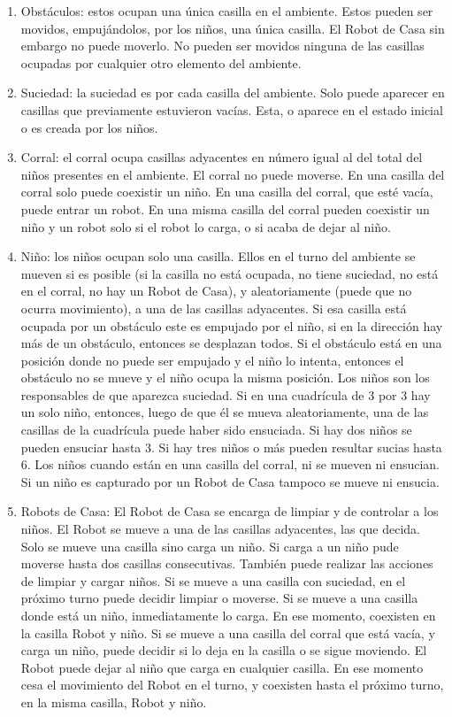 \documentclass{book}
\begin{document}
	\begin{enumerate}
		\item Obst\'aculos: estos ocupan una \'unica casilla en el ambiente. Estos pueden ser movidos, empuj\'andolos, por los ni\~nos, una \'unica casilla. El Robot de Casa sin embargo no puede moverlo. No pueden ser movidos ninguna de las casillas ocupadas por cualquier otro elemento del ambiente.
		\item Suciedad: la suciedad es por cada casilla del ambiente. Solo puede aparecer en casillas que previamente estuvieron vac\'ias. Esta, o aparece en el estado inicial o es creada por los ni\~nos.
		\item Corral: el corral ocupa casillas adyacentes en n\'umero igual al del total del ni\~nos presentes en el ambiente. El corral no puede moverse. En una casilla del corral solo puede coexistir un ni\~no. En una casilla del corral, que est\'e vac\'ia, puede entrar un robot. En una misma casilla del corral pueden coexistir un ni\~no y un robot solo si el robot lo carga, o si acaba de dejar al ni\~no.
		\item Ni\~no: los ni\~nos ocupan solo una casilla. Ellos en el turno del ambiente se mueven si es posible (si la casilla no est\'a ocupada, no tiene suciedad, no est\'a en el corral, no hay un Robot de Casa), y aleatoriamente (puede  que no ocurra movimiento), a una de las casillas adyacentes. Si esa casilla est\'a ocupada por un obst\'aculo este es empujado por el ni\~no, si en la direcci\'on hay m\'as de un obst\'aculo, entonces se desplazan todos. Si el obst\'aculo est\'a en una posici\'on donde no puede ser empujado y el ni\~no lo intenta, entonces el obst\'aculo no se mueve y el ni\~no ocupa la misma posici\'on. Los ni\~nos son los responsables de que aparezca suciedad. Si en una cuadr\'icula de 3 por 3 hay un solo ni\~no, entonces, luego de que \'el se mueva aleatoriamente, una de las casillas de la cuadr\'icula puede haber sido ensuciada. Si hay dos ni\~nos se pueden ensuciar hasta 3. Si hay tres ni\~nos o m\'as pueden resultar sucias hasta 6. Los ni\~nos cuando est\'an en una casilla del corral, ni se mueven ni ensucian. Si un ni\~no es capturado por un Robot de Casa tampoco se mueve ni ensucia.
		\item Robots de Casa: El Robot de Casa se encarga de limpiar y de controlar a los ni\~nos. El Robot se mueve a una de las casillas adyacentes, las que decida. Solo se mueve una casilla sino carga un ni\~no. Si carga a un ni\~no pude moverse hasta dos casillas consecutivas. Tambi\'en puede realizar las acciones de limpiar y cargar ni\~nos. Si se mueve a una casilla con suciedad, en el pr\'oximo turno puede decidir limpiar o moverse. Si se mueve a una casilla donde est\'a un ni\~no, inmediatamente lo carga. En ese momento, coexisten en la casilla Robot y ni\~no. Si se mueve a una casilla del corral que est\'a vac\'ia, y carga un ni\~no, puede decidir si lo deja en la casilla o se sigue moviendo. El Robot puede dejar al ni\~no que carga en cualquier casilla. En ese momento cesa el movimiento del Robot en el turno, y coexisten hasta el pr\'oximo turno, en la misma casilla, Robot y ni\~no.
	\end{enumerate}
\end{document}

